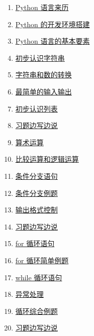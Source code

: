 \documentclass[11pt]{article}
\begin{document}
\begin{multicols}{2}
	\begin{enumerate}
		\item  \href{https://mp.weixin.qq.com/s/Rf9HLctlSm-0aH-DRQdI3A}{Python 语言来历} %
		\item  \href{https://mp.weixin.qq.com/s/j7RpYHa0RLZFPLTormBoNw}{Python 的开发环境搭建} %
		\item  \href{https://mp.weixin.qq.com/s/brAIhdh5wmOadrcC7Jjaaw}{Python 语言的基本要素}%
		\item  \href{https://mp.weixin.qq.com/s/_00ScD7_aQmeDJum_hVlmg}{初步认识字符串} %
		\item  \href{https://mp.weixin.qq.com/s/xnaY2MJBU23OhVkIRPpm0g}{字符串和数的转换} %
		\item  \href{https://mp.weixin.qq.com/s/MLftasLfpe2_SSNjOWCx6A}{最简单的输入输出} %
		\item  \href{https://mp.weixin.qq.com/s/wm9uMOLgc-fmzxQi4qRocw}{初步认识列表} %
		\item  \href{https://mp.weixin.qq.com/s/XsZVq6KFFpNDD-hkmAlqHQ}{习题边写边说} %
		\item  \href{https://mp.weixin.qq.com/s/EoWbbaJJtWXQGG9lN117Og}{算术运算} %
		\item  \href{https://mp.weixin.qq.com/s/HNG_Yj3h2VdsiynP3zWi-w}{比较运算和逻辑运算} %
		\item  \href{https://mp.weixin.qq.com/s/zME0ZwSw2NLabOOkdkG7RA}{条件分支语句} %
		\item  \href{https://mp.weixin.qq.com/s/njbmh8NYzY2__lWBtbqjpg}{条件分支例题} %
		\item  \href{https://mp.weixin.qq.com/s/1KV72KSYL3lz3LIeMPll3Q}{输出格式控制} %
		\item  \href{https://mp.weixin.qq.com/s/zjT-Y6dSFzVDqgEXw5Fv_A}{习题边写边说} %
		\item  \href{https://mp.weixin.qq.com/s/9ojRBZWCq8ByUcBJhL_mww}{for 循环语句} %
		\item  \href{https://mp.weixin.qq.com/s/DkT8FBIyKNhrOQKKmrxxDw}{for 循环简单例题} %
		\item  \href{https://mp.weixin.qq.com/s/TQLoDul1akEqiTaCJMfSBw}{while 循环语句} %
		\item  \href{https://mp.weixin.qq.com/s/zJlTx0Fp_kunuE0JgKEuaQ}{异常处理} %
		\item  \href{https://mp.weixin.qq.com/s/9l1oiQSxmQ-nCLl_v3dJGg}{循环综合例题} %
		\item  \href{https://mp.weixin.qq.com/s/43_PJo7C608ucrlbWkz70Q}{习题边写边说} %

\end{enumerate}
\end{multicols}
\end{document}

